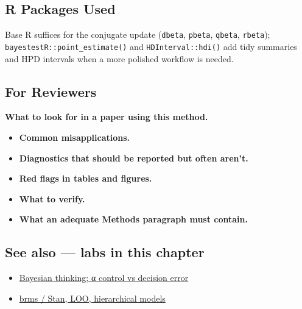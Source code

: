 \documentclass[
]{article}
\providecommand{\tightlist}{%
  \setlength{\itemsep}{0pt}\setlength{\parskip}{0pt}}
\begin{document}
\subsection{R Packages Used}\label{r-packages-used}

Base R suffices for the conjugate update (\texttt{dbeta},
\texttt{pbeta}, \texttt{qbeta}, \texttt{rbeta});
\texttt{bayestestR::point\_estimate()} and \texttt{HDInterval::hdi()}
add tidy summaries and HPD intervals when a more polished workflow is
needed.

\subsection{For Reviewers}\label{for-reviewers}

\textbf{What to look for in a paper using this method.}

\begin{itemize}
\tightlist
\item
  \textbf{Common misapplications.}
\item
  \textbf{Diagnostics that should be reported but often aren't.}
\item
  \textbf{Red flags in tables and figures.}
\item
  \textbf{What to verify.}
\item
  \textbf{What an adequate Methods paragraph must contain.}
\end{itemize}

\subsection{See also --- labs in this
chapter}\label{see-also-labs-in-this-chapter}

\begin{itemize}
\tightlist
\item
  \href{labs/lab-bayesian-thinking-control-vs-decision-error.Rmd}{Bayesian
  thinking; α control vs decision error}
\item
  \href{labs/lab-brms-stan-loo-hierarchical-models.Rmd}{brms / Stan,
  LOO, hierarchical models}
\end{itemize}
\end{document}
